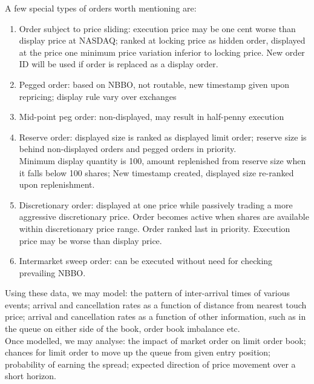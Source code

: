 \begin{definition}
\begin{enumerate}[label=\roman*.]
\begin{enumerate}[label=\arabic*.]
\end{enumerate}
A few special types of orders worth mentioning are:
\begin{enumerate}[label=\arabic*.]
\setlength{\itemsep}{0pt}
\item Order subject to price sliding: execution price may be one cent worse than display price at NASDAQ; ranked at locking price as hidden order, displayed at the price one minimum price variation inferior to locking price. New order ID will be used if order is replaced as a display order.
\item Pegged order: based on NBBO, not routable, new timestamp given upon repricing; display rule vary over exchanges
\item Mid-point peg order: non-displayed, may result in half-penny execution
\item Reserve order: displayed size is ranked as displayed limit order; reserve size is behind non-displayed orders and pegged orders in priority.\\
Minimum display quantity is 100, amount replenished from reserve size when it falls below 100 shares; New timestamp created, displayed size re-ranked upon replenishment.
\item Discretionary order: displayed at one price while passively trading a more aggressive discretionary price. Order becomes active when shares are available within discretionary price range. Order ranked last in priority. Execution price may be worse than display price.
\item Intermarket sweep order: can be executed without need for checking prevailing NBBO. 
\end{enumerate}
Using these data, we may model: the pattern of inter-arrival times of various events; arrival and cancellation rates as a function of distance from nearest touch price; arrival and cancellation rates as a function of other information, such as in the queue on either side of the book, order book imbalance etc.\\
Once modelled, we may analyse: the impact of market order on limit order book; chances for limit order to move up the queue from given entry position; probability of earning the spread; expected direction of price movement over a short horizon.
\end{enumerate}
\end{definition}

